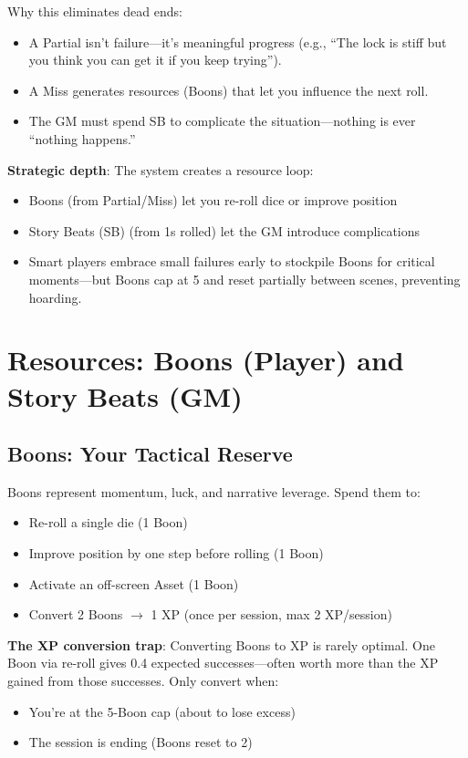 \documentclass[11pt]{article}
\begin{document}
Why this eliminates dead ends:
\begin{itemize}
    \item A Partial isn't failure---it's meaningful progress (e.g., ``The lock is stiff but you think you can get it if you keep trying'').
    \item A Miss generates resources (Boons) that let you influence the next roll.
    \item The GM must spend SB to complicate the situation---nothing is ever ``nothing happens.''
\end{itemize}

\textbf{Strategic depth}: The system creates a resource loop:
\begin{itemize}
    \item Boons (from Partial/Miss) let you re-roll dice or improve position
    \item Story Beats (SB) (from 1s rolled) let the GM introduce complications
    \item Smart players embrace small failures early to stockpile Boons for critical moments---but Boons cap at 5 and reset partially between scenes, preventing hoarding.
\end{itemize}

\section{Resources: Boons (Player) and Story Beats (GM)}

\subsection{Boons: Your Tactical Reserve}
Boons represent momentum, luck, and narrative leverage. Spend them to:
\begin{itemize}
    \item Re-roll a single die (1 Boon)
    \item Improve position by one step before rolling (1 Boon)
    \item Activate an off-screen Asset (1 Boon)
    \item Convert 2 Boons $\rightarrow$ 1 XP (once per session, max 2 XP/session)
\end{itemize}

\textbf{The XP conversion trap}: Converting Boons to XP is rarely optimal. One Boon via re-roll gives 0.4 expected successes---often worth more than the XP gained from those successes. Only convert when:
\begin{itemize}
    \item You're at the 5-Boon cap (about to lose excess)
    \item The session is ending (Boons reset to 2)
\end{itemize}
\end{document}
